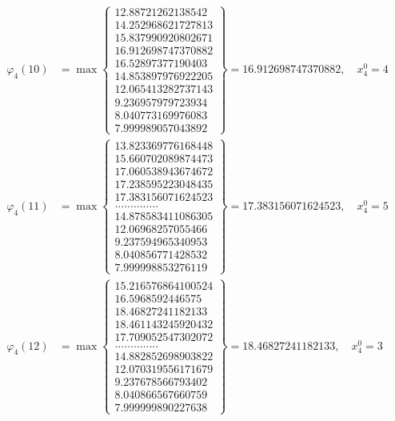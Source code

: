 \documentclass{article}
\begin{document}
\begin{align*}
  
  
  
\varphi_{4}(10) &= \max \left\{ \begin{array}{c}
12.88721262138542 \\
 14.252968621727813 \\
 15.837990920802671 \\
 16.912698747370882 \\
 16.52897377190403 \\
 14.853897976922205 \\
 12.065413282737143 \\
 9.236957979723934 \\
 8.040773169976083 \\
 7.999989057043892
\end{array} \right\} = 16.912698747370882, \quad x_{4}^0 = 4\\
  
  
  
  
\varphi_{4}(11) &= \max \left\{ \begin{array}{c}
13.823369776168448 \\
 15.660702089874473 \\
 17.060538943674672 \\
 17.238595223048435 \\
 17.383156071624523 \\
 .............. \\
 14.878583411086305 \\
 12.06968257055466 \\
 9.237594965340953 \\
 8.040856771428532 \\
 7.999998853276119
\end{array} \right\} = 17.383156071624523, \quad x_{4}^0 = 5\\
  
  
  
  
\varphi_{4}(12) &= \max \left\{ \begin{array}{c}
15.216576864100524 \\
 16.5968592446575 \\
 18.46827241182133 \\
 18.461143245920432 \\
 17.709052547302072 \\
 .............. \\
 14.882852698903822 \\
 12.070319556171679 \\
 9.237678566793402 \\
 8.040866567660759 \\
 7.999999890227638
\end{array} \right\} = 18.46827241182133, \quad x_{4}^0 = 3\\
  

\end{align*}
\end{document}
